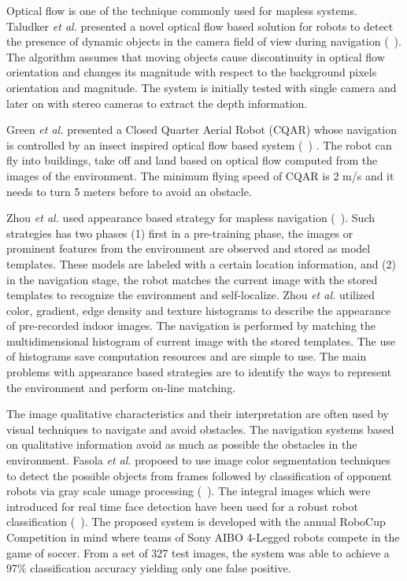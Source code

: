 Optical flow is one of the technique commonly used 
for mapless systems. Taludker \emph{et al.} presented 
a novel optical flow based solution 
for robots to detect the presence of dynamic objects 
in the camera field of view during navigation (~\citet{talukder04}).
The algorithm assumes that moving objects cause discontinuity 
in optical flow orientation and changes its magnitude with respect 
to the background pixels orientation and magnitude.
The system is initially tested with single camera and 
later on with stereo cameras to extract the depth information.


Green \emph{et al.} presented a Closed Quarter Aerial Robot (CQAR) 
whose navigation is controlled 
by an insect inspired optical flow based system  (~\citet{green03}) . 
The robot can fly into buildings, take off and land 
based on optical flow computed from the images 
of the environment. The minimum flying speed of 
CQAR is 2 m/s and it needs to turn
5 meters before to avoid an obstacle. 

 Zhou \emph{et al.} used appearance based strategy 
for mapless navigation  (~\citet{zhou03}). Such strategies 
has two phases (1) first in a pre-training phase,
the images or prominent features from the environment 
are observed and stored as model templates. 
These models are labeled with a certain location 
information, %
and (2) in the navigation stage, the
robot matches the current image with the stored templates 
to recognize the environment and self-localize. 
Zhou \emph{et al.} 
utilized color, gradient, edge density and texture 
histograms to describe the appearance of pre-recorded 
indoor images. The navigation is performed by matching 
the multidimensional histogram of current image with 
the stored templates. The use of histograms save 
computation resources and are simple to use.
The main problems with appearance based strategies are
to identify the ways to represent the environment 
and perform on-line matching. 

The image qualitative characteristics and their interpretation 
are often used by visual techniques to navigate 
and avoid obstacles. The navigation systems 
based on qualitative information avoid as
much as possible the obstacles in the environment. 
Fasola \emph{et al.} proposed to use 
image color segmentation techniques 
to detect the possible objects from frames 
followed by classification of opponent robots 
via gray scale umage processing (~\citet{fasola06}). 
The integral images which were introduced for real time 
face detection have been used for a robust robot classification 
(~\citet{viola01}). The proposed system is developed
with the annual RoboCup Competition in mind 
where teams of Sony AIBO 4-Legged robots compete
in the game of soccer. From a set of 327 test
images, the system was able to achieve a 97\% 
classification accuracy yielding only one false positive.


